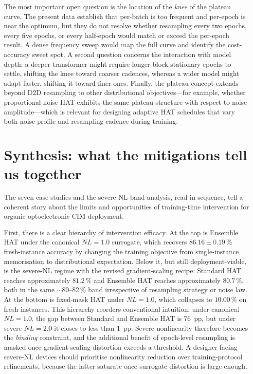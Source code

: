 The most important open question is the location of the \emph{knee} of the plateau curve. The present data establish that per-batch is too frequent and per-epoch is near the optimum, but they do not resolve whether resampling every two epochs, every five epochs, or every half-epoch would match or exceed the per-epoch result. A dense frequency sweep would map the full curve and identify the cost-accuracy sweet spot. A second question concerns the interaction with model depth: a deeper transformer might require longer block-stationary epochs to settle, shifting the knee toward coarser cadences, whereas a wider model might adapt faster, shifting it toward finer ones. Finally, the plateau concept extends beyond D2D resampling to other distributional objectives---for example, whether proportional-noise HAT exhibits the same plateau structure with respect to noise amplitude---which is relevant for designing adaptive HAT schedules that vary both noise profile and resampling cadence during training.


\section{Synthesis: what the mitigations tell us together}
\label{sec:mitigation-synthesis}

The seven case studies and the severe-NL band analysis, read in sequence, tell a coherent story about the limits and opportunities of training-time intervention for organic optoelectronic CIM deployment.

First, there is a clear hierarchy of intervention efficacy.  At the top is Ensemble HAT under the canonical $NL=1.0$ surrogate, which recovers $86.16\pm0.19\,\%$ fresh-instance accuracy by changing the training objective from single-instance memorisation to distributional expectation.  Below it, but still deployment-viable, is the severe-NL regime with the revised gradient-scaling recipe: Standard HAT reaches approximately $81.2\,\%$ and Ensemble HAT reaches approximately $80.7\,\%$, both in the same $\sim$80--82\,\% band irrespective of resampling strategy or noise law.  At the bottom is fixed-mask HAT under $NL=1.0$, which collapses to $10.00\,\%$ on fresh instances.  This hierarchy reorders conventional intuition: under canonical $NL=1.0$, the gap between Standard and Ensemble HAT is $76$~pp, but under severe $NL=2.0$ it closes to less than $1$~pp.  Severe nonlinearity therefore becomes the \emph{binding} constraint, and the additional benefit of epoch-level resampling is masked once gradient-scaling distortion exceeds a threshold.  A designer facing severe-NL devices should prioritise nonlinearity reduction over training-protocol refinements, because the latter saturate once surrogate distortion is large enough.

